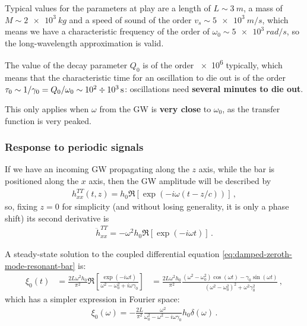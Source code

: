 \documentclass[main.tex]{subfiles}
\begin{document}
Typical values for the parameters at play are a length of \(L \sim \SI{3}{m}\), a mass of \(M \sim \SI{2e3}{kg}\) and a speed of sound of the order \(v_s \sim \SI{5e3}{m/s}\), which means we have a characteristic frequency of the order of \(\omega_0 \sim \SI{5e3}{rad / s}\), so the long-wavelength approximation is valid. 

The value of the decay parameter \(Q_0 \) is of the order \num{e6} typically, which means that the characteristic time for an oscillation to die out is of the order \(\tau_0 \sim 1/ \gamma_0 = Q_0 / \omega_0 \sim \num{e2} \divisionsymbol \SI{e3}{s}\): oscillations need \textbf{several minutes to die out}. 

This only applies when \(\omega \) from the GW is \textbf{very close} to \(\omega_0 \), as the transfer function is very peaked. 


\subsubsection{Response to periodic signals}

If we have an incoming GW propagating along the \(z\) axis, while the bar is positioned along the \(x\) axis, then the GW amplitude will be described by 
%
\begin{align}
h_{xx}^{TT} (t, z) = h_0 \Re[\exp(-i \omega (t - z/c))]
\,,
\end{align}
%
so, fixing \(z =0 \) for simplicity (and without losing generality, it is only a phase shift) its second derivative is 
%
\begin{align}
\ddot{h}_{xx}^{TT} = - \omega^2 h_0 \Re[\exp(-i \omega t)]
\,.
\end{align}

A steady-state solution to the coupled differential equation \eqref{eq:damped-zeroth-mode-resonant-bar} is:
%
\begin{align}
\xi_0 (t) &= \frac{2L \omega^2 h_0 }{\pi^2}
\Re[\frac{\exp(-i \omega t)}{\omega^2 - \omega_0^2 + i \omega \gamma_0 }]
&= \frac{2 L \omega^2 h_0 }{\pi^2} \frac{(\omega^2 - \omega^2_{0}) \cos(\omega t) - \gamma_0 \sin(\omega t)}{(\omega^2-\omega_0^2)^2 + \omega^2 \gamma_0^2}
\,,
\end{align}
%
which has a simpler expression in Fourier space:
%
\begin{align}
\xi_0 (\omega ) = - \frac{2L}{\pi^2} \frac{\omega^2}{\omega_0^2 - \omega^2 - i \omega \gamma_0 } h_0 \delta (\omega )
\,.
\end{align}
\end{document}
